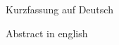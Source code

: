 \begin{abstractDE}
Kurzfassung auf Deutsch
\end{abstractDE}

\vfill

\begin{abstractEN}
Abstract in english
\end{abstractEN}

\vfill